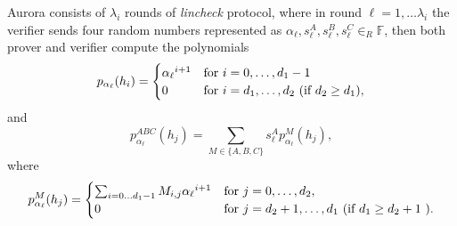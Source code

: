 Aurora consists of $\lambda_i$ rounds of \textit{lincheck} protocol, where in round $\ell = 1, \dots \lambda_i$ the verifier sends four random numbers represented as $\alpha_\ell, s^A_\ell, s^B_\ell, s^C_\ell  \in_R \mathbb{F}$, then both prover and verifier compute the polynomials
\begin{equation}\label{eq:pa}
	p_{\alpha_\ell}(h_i) = \begin{cases}
		{\alpha_\ell} ^ {i+1} & \text{for $i = 0, \dots, d_1-1 $}\\
		0          & \text{for $ i  = d_1,  \dots, d_2$ (if $d_2 \geq d_1$)},
\end{cases}
\end{equation}
and 
\begin{equation}
p^{ABC}_{\alpha_\ell}(h_j) = 
\sum_{M\in \{A, B, C\}} s^A_\ell p^{M}_{\alpha_\ell}(h_j),%
\end{equation}
where
\begin{equation}\label{eq:paABC}
p^{M}_{\alpha_\ell}(h_j) =  \begin{cases}
\sum_{i = 0 \dots d_1-1} M_{i,j}{\alpha_\ell} ^ {i+1} & \text{for $j = 0, \dots, d_2$},\\
0          & \text{for $ j  = d_2+1, \dots,  d_1$  (if $d_1 \geq d_2 + 1$ )}.
\end{cases}
\end{equation}

